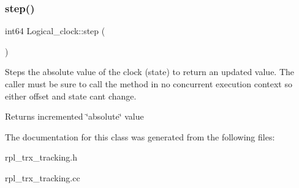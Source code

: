 \subsubsection{\texorpdfstring{step()}{step()}}
{\footnotesize\ttfamily int64 Logical\+\_\+clock\+::step (\begin{DoxyParamCaption}{ }\end{DoxyParamCaption})\hspace{0.3cm}{\ttfamily [inline]}}

Steps the absolute value of the clock (state) to return an updated value. The caller must be sure to call the method in no concurrent execution context so either offset and state can\textquotesingle{}t change.

\begin{DoxyReturn}{Returns}
incremented \char`\"{}absolute\char`\"{} value 
\end{DoxyReturn}


The documentation for this class was generated from the following files\+:\begin{DoxyCompactItemize}
\item 
rpl\+\_\+trx\+\_\+tracking.\+h\item 
rpl\+\_\+trx\+\_\+tracking.\+cc\end{DoxyCompactItemize}
